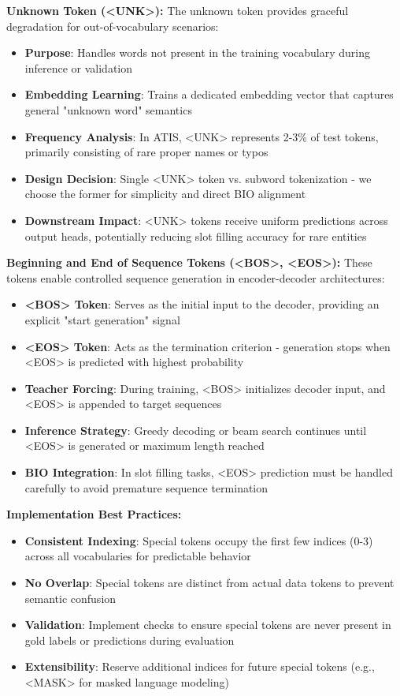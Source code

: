\documentclass[conference]{IEEEtran}
\begin{document}
\textbf{Unknown Token (<UNK>):}
The unknown token provides graceful degradation for out-of-vocabulary scenarios:
\begin{itemize}
  \item \textbf{Purpose}: Handles words not present in the training vocabulary during inference or validation
  \item \textbf{Embedding Learning}: Trains a dedicated embedding vector that captures general "unknown word" semantics
  \item \textbf{Frequency Analysis}: In ATIS, <UNK> represents 2-3\% of test tokens, primarily consisting of rare proper names or typos
  \item \textbf{Design Decision}: Single <UNK> token vs. subword tokenization - we choose the former for simplicity and direct BIO alignment
  \item \textbf{Downstream Impact}: <UNK> tokens receive uniform predictions across output heads, potentially reducing slot filling accuracy for rare entities
\end{itemize}

\textbf{Beginning and End of Sequence Tokens (<BOS>, <EOS>):}
These tokens enable controlled sequence generation in encoder-decoder architectures:
\begin{itemize}
  \item \textbf{<BOS> Token}: Serves as the initial input to the decoder, providing an explicit "start generation" signal
  \item \textbf{<EOS> Token}: Acts as the termination criterion - generation stops when <EOS> is predicted with highest probability
  \item \textbf{Teacher Forcing}: During training, <BOS> initializes decoder input, and <EOS> is appended to target sequences
  \item \textbf{Inference Strategy}: Greedy decoding or beam search continues until <EOS> is generated or maximum length reached
  \item \textbf{BIO Integration}: In slot filling tasks, <EOS> prediction must be handled carefully to avoid premature sequence termination
\end{itemize}

\textbf{Implementation Best Practices:}
\begin{itemize}
  \item \textbf{Consistent Indexing}: Special tokens occupy the first few indices (0-3) across all vocabularies for predictable behavior
  \item \textbf{No Overlap}: Special tokens are distinct from actual data tokens to prevent semantic confusion
  \item \textbf{Validation}: Implement checks to ensure special tokens are never present in gold labels or predictions during evaluation
  \item \textbf{Extensibility}: Reserve additional indices for future special tokens (e.g., <MASK> for masked language modeling)
\end{itemize}
\end{document}
